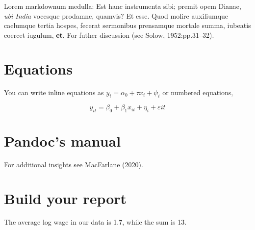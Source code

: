 \documentclass[
]{article}
\begin{document}
Lorem markdownum medulla: Est hanc instrumenta sibi; premit opem Dianae, \emph{ubi
India} vocesque prodamne, quamvis? Et esse. Quod molire auxiliumque caelumque
tertia hospes, fecerat sermonibus prensamque mortale summa, iubeatis coercet
iugulum, \textbf{et}. For futher discussion (see Solow, 1952:pp.31--32).

\hypertarget{equations}{%
\section{Equations}\label{equations}}

You can write inline equations as \(y_i = \alpha_0 + \tau x_i + \psi_i\) or numbered equations,

\begin{equation}
y_{it} = \beta_0 + \beta_1 x_{it} + \eta_i + \varepsilon{it}
\end{equation}

\hypertarget{pandocs-manual}{%
\section{Pandoc's manual}\label{pandocs-manual}}

For additional insights see MacFarlane (2020).

\hypertarget{build-your-report}{%
\section{Build your report}\label{build-your-report}}

The average log wage in our data is 1.7, while the sum is 13.
\end{document}
